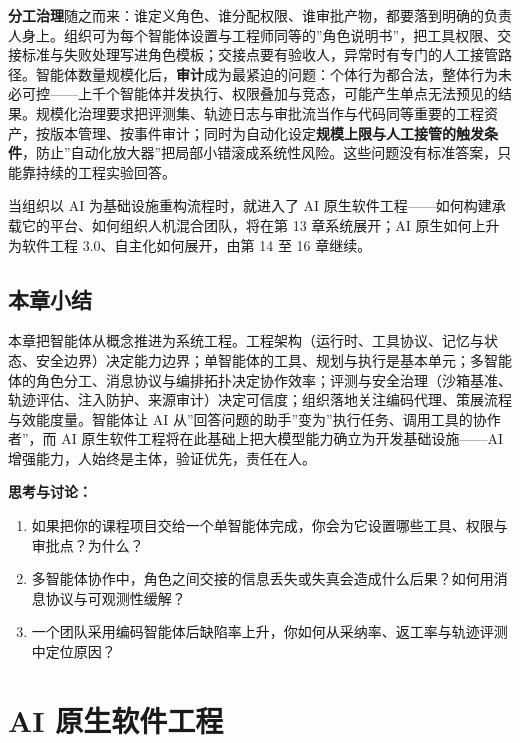 \documentclass[12pt,a4paper,twoside,openany]{ctexbook}
\numberwithin{figure}{chapter}
\numberwithin{table}{chapter}
\providecommand{\tightlist}{\setlength{\itemsep}{0pt}\setlength{\parskip}{0pt}}
\begin{document}
\textbf{分工治理}随之而来：谁定义角色、谁分配权限、谁审批产物，都要落到明确的负责人身上。组织可为每个智能体设置与工程师同等的''角色说明书''，把工具权限、交接标准与失败处理写进角色模板；交接点要有验收人，异常时有专门的人工接管路径。智能体数量规模化后，\textbf{审计}成为最紧迫的问题：个体行为都合法，整体行为未必可控------上千个智能体并发执行、权限叠加与竞态，可能产生单点无法预见的结果。规模化治理要求把评测集、轨迹日志与审批流当作与代码同等重要的工程资产，按版本管理、按事件审计；同时为自动化设定\textbf{规模上限与人工接管的触发条件}，防止''自动化放大器''把局部小错滚成系统性风险。这些问题没有标准答案，只能靠持续的工程实验回答。

当组织以 AI 为基础设施重构流程时，就进入了 AI
原生软件工程------如何构建承载它的平台、如何组织人机混合团队，将在第 13
章系统展开；AI 原生如何上升为软件工程 3.0、自主化如何展开，由第 14 至 16
章继续。

\section{本章小结}\label{ux672cux7ae0ux5c0fux7ed3-11}

本章把智能体从概念推进为系统工程。工程架构（运行时、工具协议、记忆与状态、安全边界）决定能力边界；单智能体的工具、规划与执行是基本单元；多智能体的角色分工、消息协议与编排拓扑决定协作效率；评测与安全治理（沙箱基准、轨迹评估、注入防护、来源审计）决定可信度；组织落地关注编码代理、策展流程与效能度量。智能体让
AI 从''回答问题的助手''变为''执行任务、调用工具的协作者''，而 AI
原生软件工程将在此基础上把大模型能力确立为开发基础设施------AI
增强能力，人始终是主体，验证优先，责任在人。

\textbf{思考与讨论：}

\begin{enumerate}
\def\labelenumi{\arabic{enumi}.}
\tightlist
\item
  如果把你的课程项目交给一个单智能体完成，你会为它设置哪些工具、权限与审批点？为什么？
\item
  多智能体协作中，角色之间交接的信息丢失或失真会造成什么后果？如何用消息协议与可观测性缓解？
\item
  一个团队采用编码智能体后缺陷率上升，你如何从采纳率、返工率与轨迹评测中定位原因？
\end{enumerate}

\chapter{AI 原生软件工程}\label{ai-ux539fux751fux8f6fux4ef6ux5de5ux7a0b}
\end{document}
